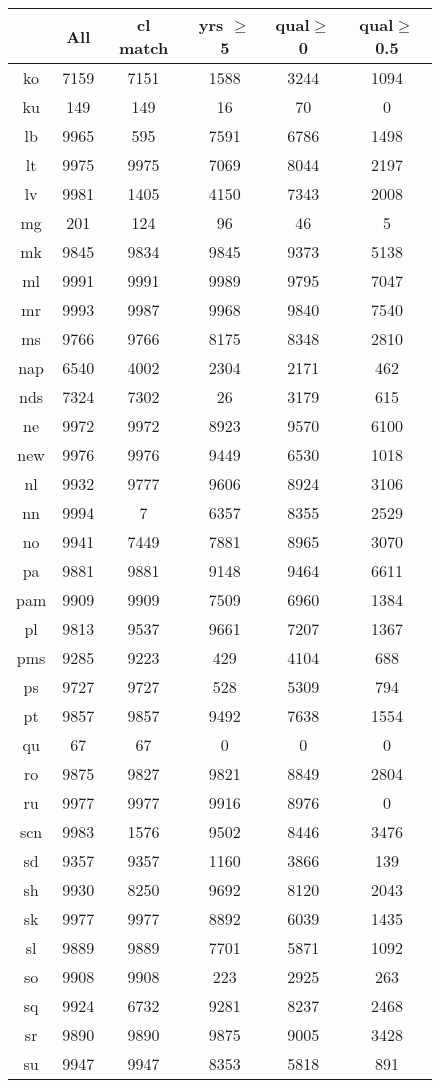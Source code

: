 \begin{figure}[h]
\centering
\begin{tabular}{cccccc}
&All&cl match&yrs $\geq$ 5&qual$\geq$0&qual$\geq$0.5\\
\hline\hline
ko&7159&7151&1588&3244&1094\\
ku&149&149&16&70&0\\
lb&9965&595&7591&6786&1498\\
lt&9975&9975&7069&8044&2197\\
lv&9981&1405&4150&7343&2008\\
mg&201&124&96&46&5\\
mk&9845&9834&9845&9373&5138\\
ml&9991&9991&9989&9795&7047\\
mr&9993&9987&9968&9840&7540\\
ms&9766&9766&8175&8348&2810\\
nap&6540&4002&2304&2171&462\\
nds&7324&7302&26&3179&615\\
ne&9972&9972&8923&9570&6100\\
new&9976&9976&9449&6530&1018\\
nl&9932&9777&9606&8924&3106\\
nn&9994&7&6357&8355&2529\\
no&9941&7449&7881&8965&3070\\
pa&9881&9881&9148&9464&6611\\
pam&9909&9909&7509&6960&1384\\
pl&9813&9537&9661&7207&1367\\
pms&9285&9223&429&4104&688\\
ps&9727&9727&528&5309&794\\
pt&9857&9857&9492&7638&1554\\
qu&67&67&0&0&0\\
ro&9875&9827&9821&8849&2804\\
ru&9977&9977&9916&8976&0\\
scn&9983&1576&9502&8446&3476\\
sd&9357&9357&1160&3866&139\\
sh&9930&8250&9692&8120&2043\\
sk&9977&9977&8892&6039&1435\\
sl&9889&9889&7701&5871&1092\\
so&9908&9908&223&2925&263\\
sq&9924&6732&9281&8237&2468\\
sr&9890&9890&9875&9005&3428\\
su&9947&9947&8353&5818&891\\

\end{tabular}
\end{figure}
